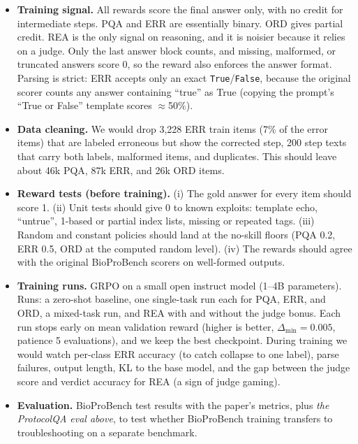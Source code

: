 \documentclass[10pt]{article}
\begin{document}
\begin{itemize}
\item \textbf{Training signal.} All rewards score the final answer only, with no
  credit for intermediate steps. PQA and ERR are essentially binary. ORD gives partial
  credit. REA is the only signal on reasoning, and it is noisier because it relies on a
  judge. Only the last answer block counts, and missing, malformed, or truncated answers
  score 0, so the reward also enforces the answer format. Parsing is strict:
  ERR accepts only an exact \texttt{True}/\texttt{False}, because the original scorer counts any
  answer containing ``true'' as True (copying the prompt's ``True or False'' template
  scores $\approx$50\%).
\item \textbf{Data cleaning.} We would drop 3,228 ERR train items (7\% of the error items)
  that are labeled erroneous but show the corrected step, 200 step texts that carry both
  labels, malformed items, and duplicates. This should leave about 46k PQA, 87k ERR, and
  26k ORD items.
\item \textbf{Reward tests (before training).} (i) The gold answer for every item should
  score 1. (ii) Unit tests should give 0 to known exploits: template echo, ``untrue'',
  1-based or partial index lists, missing or repeated tags. (iii) Random and constant
  policies should land at the no-skill floors (PQA 0.2, ERR 0.5, ORD at the computed random
  level). (iv) The rewards should agree with the original BioProBench scorers on
  well-formed outputs.
\item \textbf{Training runs.} GRPO on a small open instruct model (1--4B parameters). Runs:
  a zero-shot baseline, one single-task run each for PQA, ERR, and ORD, a mixed-task run,
  and REA with and without the judge bonus. Each run stops early on mean validation
  reward (higher is better, $\Delta_{\min}=0.005$, patience 5 evaluations), and we keep the
  best checkpoint. During training we would watch per-class ERR accuracy (to catch
  collapse to one label), parse failures, output length, KL to the base model, and the
  gap between the judge score and verdict accuracy for REA (a sign of judge gaming).
\item \textbf{Evaluation.} BioProBench test results with the paper's metrics, plus
  \emph{the ProtocolQA eval above}, to test whether BioProBench training transfers to
  troubleshooting on a separate benchmark.
\end{itemize}
\end{document}
